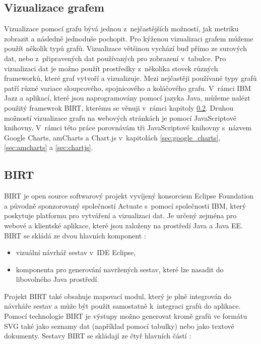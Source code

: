\documentclass[czech,master]{diploma}
\begin{document}
\subsection{Vizualizace grafem}
Vizualizace pomocí grafu bývá jednou z~nejčastějších možností, jak metriku zobrazit a následně jednoduše pochopit. Pro kýženou vizualizaci grafem můžeme použít několik typů grafů. Vizualizace většinou vychází buď přímo ze surových dat, nebo z~připravených dat používaných pro zobrazení v~tabulce. Pro vizualizaci dat je možno použít prostředky z~několika stovek různých frameworků, které graf vytvoří a vizualizuje. Mezi nejčastěji používané typy grafů patří různé variace sloupcového, spojnicového a koláčového grafu. V~rámci IBM Jazz a aplikací, které jsou naprogramovány pomocí jazyka Java, můžeme nalézt použitý framewrok BIRT, kterému se věnuji v~rámci kapitoly \ref{sec:birt}. Druhou možností vizualizace grafu na webových stránkách je pomocí JavaScriptové knihovny. V~rámci této práce porovnávám tři JavaScriptové knihovny s~názvem Google Charts, amCharts a Chart.js v~kapitolách \ref{sec:google_charts}, \ref{sec:amcharts} a \ref{sec:chartjs}.

\subsection{BIRT}
\label{sec:birt}
BIRT je open source softwarový projekt vyvíjený konsorciem Eclipse Foundation a původně sponzorovaný společností Actuate s~pomocí společnosti IBM, který poskytuje platformu pro vytváření a vizualizaci dat. Je určený zejména pro webové a klientské aplikace, které jsou založeny na prostředí Java a Java EE. BIRT se skládá ze dvou hlavních komponent \cite{ref:birt_about}:

\begin{itemize}
\item vizuální návrhář sestav v~IDE Eclipse,
\item komponenta pro generování navržených sestav, které lze nasadit do libovolného Java prostředí.
\end{itemize}

Projekt BIRT také obsahuje mapovací modul, který je plně integrován do návrháře sestav a může být použit samostatně k~integraci grafů do aplikace. Pomocí technologie BIRT je výstupy možno generovat kromě grafů ve formátu SVG také jako seznamy dat (například pomocí tabulky) nebo jako textové dokumenty. Sestavy BIRT se skládají ze čtyř hlavních částí \cite{ref:birt_about}:
\end{document}
